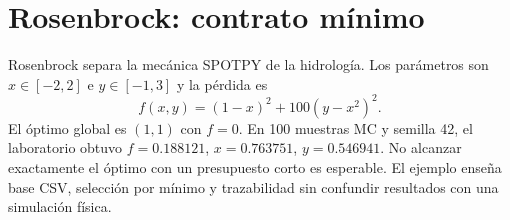 \chapter{Rosenbrock: contrato mínimo}
Rosenbrock separa la mecánica SPOTPY de la hidrología. Los parámetros son $x\in[-2,2]$ e $y\in[-1,3]$ y la pérdida es
\[f(x,y)=(1-x)^2+100(y-x^2)^2.\]
El óptimo global es $(1,1)$ con $f=0$. En 100 muestras MC y semilla 42, el laboratorio obtuvo $f=0.188121$, $x=0.763751$, $y=0.546941$. No alcanzar exactamente el óptimo con un presupuesto corto es esperable. El ejemplo enseña base CSV, selección por mínimo y trazabilidad sin confundir resultados con una simulación física.

